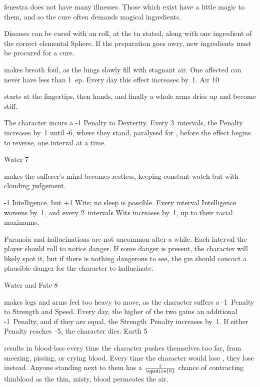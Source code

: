 \begin{multicols}{2}
\renewcommand\npcsymbol{\glssymbol{eldren}}

\noindent
\Gls{fenestra} does not have many illnesses.
Those which exist have a little magic to them, and so the cure often demands magical \glspl{ingredient}.

Diseases can be cured with an  roll, at the \gls{tn} stated, along with one \gls{ingredient} of the correct elemental Sphere.
If the preparation goes awry, new \glspl{ingredient} must be procured for a cure.

%
  {makes breath foul, as the lungs slowly fill with stagnant air.
    One affected can never have less than 1~\gls{ep}.
    Every day this effect increases by~1.
  }%
  {Air}%
  {10}

%
  {starts at the fingertips, then hands, and finally a whole arms dries up and become stiff.

    The character incurs a -1 Penalty to Dexterity.
    Every 3~\glspl{interval}, the Penalty increases by~1 until -6, where they stand, paralysed for , before the effect begins to reverse, one \gls{interval} at a time.}%
  {Water}%
  {7}

%
  {makes the sufferer's mind becomes restless, keeping constant watch but with clouding judgement.

    -1 Intelligence, but +1 Wits; no sleep is possible.
    Every \gls{interval} Intelligence worsens by~1, and every 2~\glspl{interval} Wits increases by~1, up to their racial maximums.%

    Paranoia and hallucinations are not uncommon after a while.
    Each \gls{interval} the player should roll  to notice danger.
    If some danger is present, the character will likely spot it, but if there is nothing dangerous to see, the \gls{gm} should concoct a plausible danger for the character to hallucinate.}
  {Water and Fate}%
  {8}

%
  {makes legs and arms feel too heavy to move, as the character suffers a -1~Penalty to Strength and Speed.
  Every day, the higher of the two gains an additional -1~Penalty, and if they are equal, the Strength~Penalty increases by~1.
  If either Penalty reaches~-5, the character dies.}%
  {Earth}%
  {5}

%
  {results in blood-loss every time the character pushes themselves too far, from sneezing, pissing, or crying blood.
  Every time the character would lose , they lose  instead.
  Anyone standing next to them has a $\frac{1}{\epsdice{6}}$ chance of contracting thinblood as the thin, misty, blood permeates the air.

}
\end{multicols}
